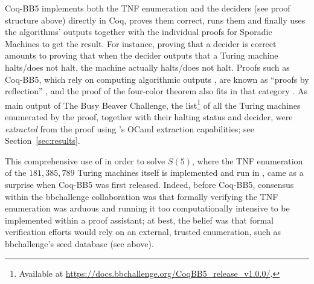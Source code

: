 \documentclass[a4paper,british]{article}
\theoremstyle{definition} %
\numberwithin{equation}{section}
\theoremstyle{definition} %
\newcommand{\BBtheFifthTNF}{181{,}385{,}789}
\newcommand{\CoqBB}{Coq-BB5\xspace}
\begin{document}
\CoqBB implements both the TNF enumeration and the deciders (see proof structure above) directly in Coq, proves them correct, runs them and finally uses the algorithms' outputs together with the individual proofs for Sporadic Machines to get the result. For instance, proving that a decider is correct amounts to proving that when the decider outputs that a Turing machine halts/does not halt, the machine actually halts/does not halt. Proofs such as \CoqBB, which rely on computing algorithmic outputs \cite{vmcompute,nativecompute}, are known as ``proofs by reflection'' \cite{boutin1997using}, and the \Coq proof of the four-color theorem also fits in that category \cite{gonthier2010introduction}. As main output of The Busy Beaver Challenge, the list\footnote{Available at \url{https://docs.bbchallenge.org/CoqBB5_release_v1.0.0/}.} of all the Turing machines enumerated by the \Coq proof, together with their halting status and decider, were \textit{extracted} from the proof using \Coq's OCaml extraction capabilities; see Section~\ref{sec:results}.


This comprehensive use of \Coq in order to solve $S(5)$, where the TNF enumeration of the $\BBtheFifthTNF$ Turing machines itself is implemented and run in \Coq, came as a surprise when \CoqBB was first released. Indeed, before \CoqBB, consensus within the bbchallenge collaboration  was that formally verifying the TNF enumeration was arduous and running it too computationally intensive to be implemented within a proof assistant; at best, the belief was that formal verification efforts would rely on an external, trusted enumeration, such as bbchallenge's seed database (see above).

\end{document}
